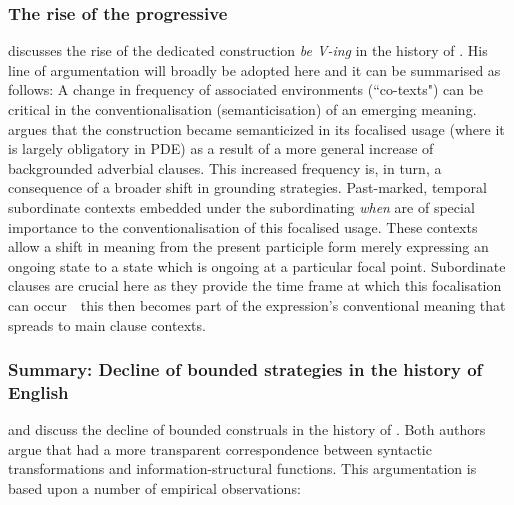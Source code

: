 \documentclass[output=paper,colorlinks,citecolor=brown]{langscibook}
\begin{document}
\subsubsection{The rise of the progressive}\label{sec:Chark5.1.2}

\citet{petre2016grammaticalization} discusses the rise of the dedicated   construction \textit{be V-ing} in the history of . His line of argumentation will broadly be adopted here and it can be summarised as follows: A change in frequency of associated environments (``co-texts") can be critical in the conventionalisation (semanticisation) of an emerging meaning. \citeauthor{petre2016grammaticalization} argues that the   construction became semanticized in its focalised usage (where it is largely obligatory in PDE) as a result of a more general increase of backgrounded adverbial clauses. This increased frequency is, in turn, a consequence of a broader shift in grounding strategies. Past-marked, temporal subordinate contexts embedded under the subordinating  \textit{when} are of special importance to the conventionalisation of this focalised usage. These contexts allow a shift in meaning from the present participle form merely expressing an ongoing state to a state which is ongoing at a particular focal point. Subordinate clauses are crucial here as they provide the time frame at which this focalisation can occur\ \textendash{}\  this then becomes part of the expression's conventional meaning that spreads to main clause contexts.

\subsubsection{Summary: Decline of bounded strategies in the history of English}\label{sec:Chark5.1.3}

\citet{petre2010functions} and \citet{los2012} discuss the decline of bounded construals in the history of . Both authors argue that  had a more transparent correspondence between syntactic transformations and information-structural functions. This argumentation is based upon a number of empirical observations:
\end{document}
